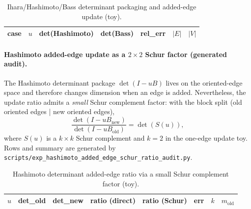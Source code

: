 \begin{table}[t]
\centering
\scriptsize
\setlength{\tabcolsep}{6pt}
\renewcommand{\arraystretch}{1.15}
\begin{tabular}{l r r r r r r}
\toprule
case & $u$ & det(Hashimoto) & det(Bass) & rel\_err & $|E|$ & $|V|$ \\
\midrule

\end{tabular}
\caption{Ihara/Hashimoto/Bass determinant packaging and added-edge update (toy).}
\label{tab:ihara_hashimoto_added_edge_audit}
\end{table}

%

\paragraph{Hashimoto added-edge update as a $2\times2$ Schur factor (generated audit).}
\AuditTag The Hashimoto determinant package $\det(I-uB)$ lives on the oriented-edge space and therefore changes dimension when an edge is added.
Nevertheless, the update ratio admits a \emph{small} Schur complement factor: with the block split (old oriented edges | new oriented edges),
\[
\frac{\det(I-uB_{\mathrm{new}})}{\det(I-uB_{\mathrm{old}})}=\det(S(u)),
\]
where $S(u)$ is a $k\times k$ Schur complement and $k=2$ in the one-edge update toy.
Rows and summary are generated by \texttt{scripts/exp\_hashimoto\_added\_edge\_schur\_ratio\_audit.py}.

\begin{table}[t]
\centering
\scriptsize
\setlength{\tabcolsep}{6pt}
\renewcommand{\arraystretch}{1.15}
\begin{tabular}{r r r r r r r r}
\toprule
$u$ & det\_old & det\_new & ratio (direct) & ratio (Schur) & err & $k$ & $m_{\mathrm{old}}$ \\
\midrule

\end{tabular}
\caption{Hashimoto determinant added-edge ratio via a small Schur complement factor (toy).}
\label{tab:hashimoto_added_edge_schur_audit}
\end{table}

%
